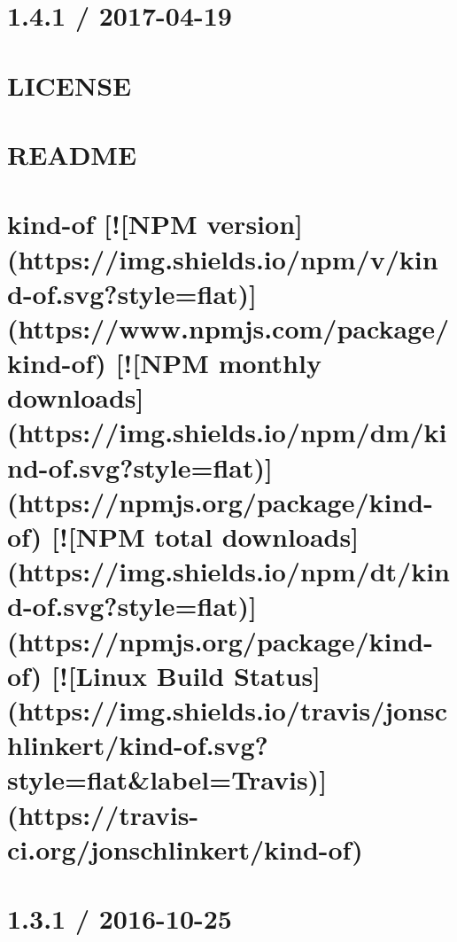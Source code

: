 \documentclass[twoside]{book}
\newcommand{\+}{\discretionary{\mbox{\scriptsize$\hookleftarrow$}}{}{}}
\begin{document}
\chapter{1.4.1 / 2017-\/04-\/19}
\label{md__c_1_workspace_demo_src_main_script_node_modules_jsx-ast-utils__c_h_a_n_g_e_l_o_g}

\chapter{L\+I\+C\+E\+N\+SE}
\label{md__c_1_workspace_demo_src_main_script_node_modules_jsx-ast-utils__l_i_c_e_n_s_e}

\chapter{R\+E\+A\+D\+ME}
\label{md__c_1_workspace_demo_src_main_script_node_modules_jsx-ast-utils__r_e_a_d_m_e}

\chapter{kind-\/of \mbox{[}!\mbox{[}N\+PM version\mbox{]}(https\+://img.shields.\+io/npm/v/kind-\/of.svg?style=flat)\mbox{]}(https\+://www.npmjs.\+com/package/kind-\/of) \mbox{[}!\mbox{[}N\+PM monthly downloads\mbox{]}(https\+://img.shields.\+io/npm/dm/kind-\/of.svg?style=flat)\mbox{]}(https\+://npmjs.org/package/kind-\/of) \mbox{[}!\mbox{[}N\+PM total downloads\mbox{]}(https\+://img.shields.\+io/npm/dt/kind-\/of.svg?style=flat)\mbox{]}(https\+://npmjs.org/package/kind-\/of) \mbox{[}!\mbox{[}Linux Build Status\mbox{]}(https\+://img.shields.\+io/travis/jonschlinkert/kind-\/of.svg?style=flat\&label=Travis)\mbox{]}(https\+://travis-\/ci.org/jonschlinkert/kind-\/of)}
\label{md__c_1_workspace_demo_src_main_script_node_modules_kind-of__r_e_a_d_m_e}

\chapter{1.3.1 / 2016-\/10-\/25}
\label{md__c_1_workspace_demo_src_main_script_node_modules_klaw__c_h_a_n_g_e_l_o_g}

\end{document}
